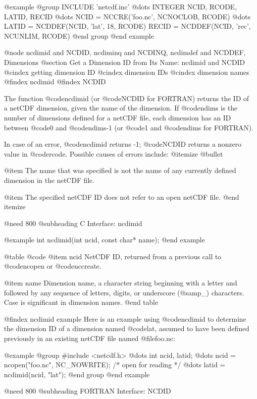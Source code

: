@example
@group
      INCLUDE 'netcdf.inc'
         @dots{}
      INTEGER NCID, RCODE, LATID, RECID
         @dots{}
      NCID = NCCRE('foo.nc', NCNOCLOB, RCODE)
         @dots{}
      LATID = NCDDEF(NCID, 'lat', 18, RCODE)
      RECID = NCDDEF(NCID, 'rec', NCUNLIM, RCODE)
@end group
@end example

@node ncdimid and NCDID, ncdiminq and NCDINQ, ncdimdef and NCDDEF, Dimensions
@section Get a Dimension ID from Its Name:  ncdimid and NCDID
@cindex getting dimension ID
@cindex dimension IDs
@cindex dimension names
@findex ncdimid
@findex NCDID

The function @code{ncdimid} (or @code{NCDID} for FORTRAN) returns the ID
of a netCDF dimension, given the name of the dimension.  If @code{ndims}
is the number of dimensions defined for a netCDF file, each dimension
has an ID between @code{0} and @code{ndims-1} (or @code{1} and
@code{ndims} for FORTRAN).

In case of an error, @code{ncdimid} returns -1; @code{NCDID} returns a
nonzero value in @code{rcode}.  Possible causes of errors include:
@itemize @bullet

@item
The name that was specified is not the name of any currently defined
dimension in the netCDF file.

@item
The specified netCDF ID does not refer to an open netCDF file.
@end itemize

@need 800
@subheading C Interface:  ncdimid

@example
int ncdimid(int ncid, const char* name);
@end example

@table @code
@item ncid
NetCDF ID, returned from a previous call to @code{ncopen} or @code{nccreate}.

@item name
Dimension name, a character string beginning with a letter and followed
by any sequence of letters, digits, or underscore (@samp{_}) characters.
Case is significant in dimension names.
@end table

@findex ncdimid example
Here is an example using @code{ncdimid} to determine the dimension ID of
a dimension named @code{lat}, assumed to have been defined previously in
an existing netCDF file named @file{foo.nc}:

@example
@group
#include <netcdf.h>
   @dots{}
int ncid, latid;
   @dots{}
ncid = ncopen("foo.nc", NC_NOWRITE);  /* open for reading */
   @dots{}
latid = ncdimid(ncid, "lat");
@end group
@end example

@need 800
@subheading FORTRAN Interface:  NCDID

